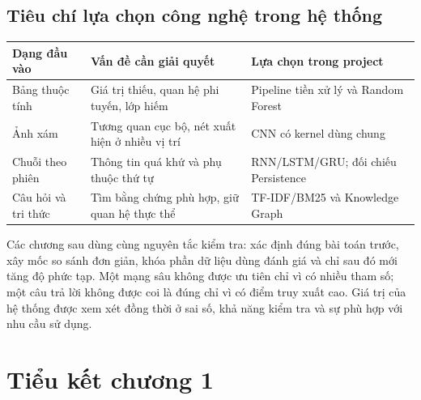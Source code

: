 \subsection{Tiêu chí lựa chọn công nghệ trong hệ thống}\label{tiuxeau-chuxed-lux1ef1a-chux1ecdn-cuxf4ng-nghux1ec7-trong-hux1ec7-thux1ed1ng}

\label{tab:legacy-1.3}

{\def\LTcaptype{none} %
\begin{longtable}[]{@{}
  >{\raggedright\arraybackslash}p{}
  >{\raggedright\arraybackslash}p{}
  >{\raggedright\arraybackslash}p{}@{}}
\toprule\noalign{}
\begin{minipage}[b]{\linewidth}\raggedright
\textbf{Dạng đầu vào}
\end{minipage} & \begin{minipage}[b]{\linewidth}\centering
\textbf{Vấn đề cần giải quyết}
\end{minipage} & \begin{minipage}[b]{\linewidth}\centering
\textbf{Lựa chọn trong project}
\end{minipage} \\
\midrule\noalign{}
\endhead
\bottomrule\noalign{}
\endlastfoot
Bảng thuộc tính & Giá trị thiếu, quan hệ phi tuyến, lớp hiếm & Pipeline
tiền xử lý và Random Forest \\
Ảnh xám & Tương quan cục bộ, nét xuất hiện ở nhiều vị trí & CNN có
kernel dùng chung \\
Chuỗi theo phiên & Thông tin quá khứ và phụ thuộc thứ tự & RNN/LSTM/GRU;
đối chiếu Persistence \\
Câu hỏi và tri thức & Tìm bằng chứng phù hợp, giữ quan hệ thực thể &
TF-IDF/BM25 và Knowledge Graph \\
\end{longtable}
}

Các chương sau dùng cùng nguyên tắc kiểm tra: xác định đúng bài toán
trước, xây mốc so sánh đơn giản, khóa phần dữ liệu dùng đánh giá và chỉ
sau đó mới tăng độ phức tạp. Một mạng sâu không được ưu tiên chỉ vì có
nhiều tham số; một câu trả lời không được coi là đúng chỉ vì có điểm
truy xuất cao. Giá trị của hệ thống được xem xét đồng thời ở sai số, khả
năng kiểm tra và sự phù hợp với nhu cầu sử dụng.

\section{Tiểu kết chương 1}\label{tiux1ec3u-kux1ebft-chux1b0ux1a1ng-1}

